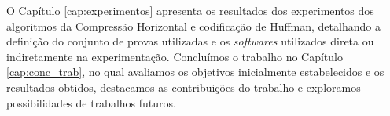 O Capítulo \ref{cap:experimentos} apresenta os resultados dos experimentos dos algoritmos da Compressão Horizontal e codificação de Huffman, detalhando a definição do conjunto de provas utilizadas e os \textit{softwares} utilizados direta ou indiretamente na experimentação. Concluímos o trabalho no Capítulo \ref{cap:conc_trab}, no qual avaliamos os objetivos inicialmente estabelecidos e os resultados obtidos, destacamos as contribuições do trabalho e exploramos possibilidades de trabalhos futuros.